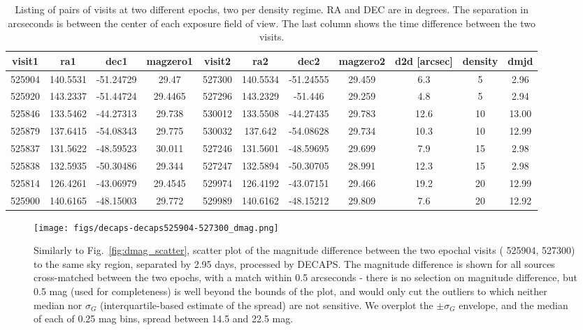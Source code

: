 \documentclass[DM,lsstdraft,toc,usenatbib]{lsstdoc}
\begin{document}
\begin{centering}
\begin{table}

\caption{Listing of pairs of visits at two different epochs, two per density regime. RA and DEC are in degrees. The separation in arcseconds is between the center of each exposure field of view. The last column shows the time difference between the two visits.}
\label{tab:epoch12_selection}
\begin{tabular}{ccccccccccc}
\hline
visit1 & ra1 & dec1 & magzero1 & visit2 & ra2 & dec2 & magzero2 & d2d [arcsec] & density & dmjd \\
\hline
525904 & 140.5531 & -51.24729 & 29.47 & 527300 & 140.5534 & -51.24555 & 29.459 & 6.3 & 5 & 2.96 \\
525920 & 143.2337 & -51.44724 & 29.4465 & 527296 & 143.2329 & -51.446 & 29.259 & 4.8 & 5 & 2.94 \\
525846 & 133.5462 & -44.27313 & 29.738 & 530012 & 133.5508 & -44.27435 & 29.783 & 12.6 & 10 & 13.00 \\
525879 & 137.6415 & -54.08343 & 29.775 & 530032 & 137.642 & -54.08628 & 29.734 & 10.3 & 10 & 12.99 \\
525837 & 131.5622 & -48.59523 & 30.011 & 527246 & 131.5601 & -48.59695 & 29.699 & 7.9 & 15 & 2.98 \\
525838 & 132.5935 & -50.30486 & 29.344 & 527247 & 132.5894 & -50.30705 & 28.991 & 12.3 & 15 & 2.98\\
525814 & 126.4261 & -43.06979 & 29.4545 & 529974 & 126.4192 & -43.07151 & 29.466 & 19.2 & 20 & 12.99 \\
525900 & 140.6165 & -48.15003 & 29.772 & 529989 & 140.6162 & -48.15212 & 29.809 & 7.6 & 20 & 12.92 \\
\hline
\end{tabular}

\end{table}
\end{centering}




\begin{figure}
\begin{centering}
\texttt{[image: figs/decaps-decaps525904-527300\_dmag.png]}
\caption{Similarly to Fig.~\ref{fig:dmag_scatter}, scatter plot of the magnitude difference between the two epochal visits ( 525904, 527300) to the same sky region, separated by 2.95 days, processed by DECAPS. The magnitude difference is shown for all sources cross-matched between  the two epochs, with a match within 0.5 arcseconds - there is no selection on magnitude difference, but 0.5 mag (used for completeness) is well beyond the bounds of the plot, and would only cut the outliers to which neither median nor $\sigma_{G}$ (interquartile-based estimate of the spread) are not sensitive.  We overplot the $\pm \sigma_{G}$ envelope, and the median of each of 0.25 mag bins, spread between 14.5 and 22.5 mag. }
\label{fig:epoch-epoch_decaps}
\end{centering}
\end{figure} 
\end{document}
